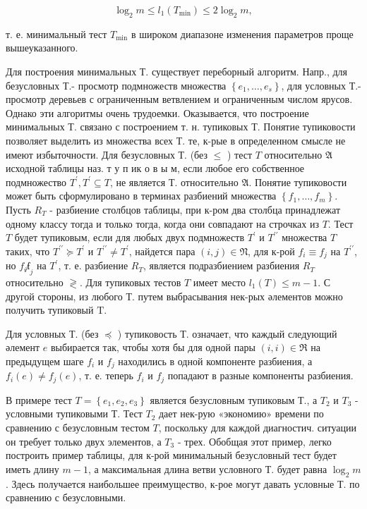 \documentclass[10pt]{article}
\begin{document}
\[

\log _{2} m \leqslant l_{1}\left(T_{\min }\right) \leqslant 2 \log _{2} m,

\]



т. е. минимальный тест $T_{\min }$ в широком диапазоне изменения параметров проще вышеуказанного.



Для построения минимальных Т. существует переборный алгоритм. Напр., для безусловных Т.- просмотр подмножеств множества $\left\{e_{1}, \ldots, e_{s}\right\}$, для условных Т.- просмотр деревьев с ограниченным ветвлением и ограниченным числом ярусов. Однако эти алгоритмы очень трудоемки. Оказывается, что построение минимальных Т. связано с построением т. н. тупиковых Т. Понятие тупиковости позволяет выделить из множества всех Т. те, к-рые в определенном смысле не имеют избыточности. Для безусловных Т. (без $\leqslant$ ) тест $T$ относительно $\mathfrak{A}$ исходной таблицы наз. т у п ик о в ы м, если любое его собственное подмножество $T^{\prime}, T^{\prime} \subseteq T$, не является Т. относительно $\mathfrak{A}$. Понятие тупиковости может быть сформулировано в терминах разбиений множества $\left\{f_{1}, \ldots, f_{m}\right\}$. Пусть $R_{T}$ - разбиение столбцов таблицы, при к-ром два столбца принадлежат одному классу тогда и только тогда, когда они совпадают на строчках из $T$. Тест $T$ будет тупиковым, если для любых двух подмножеств $T^{\prime}$ и $T^{\prime \prime}$ множества $T$ таких, что $T^{\prime \prime} \succeq T^{\prime}$ и $T^{\prime \prime} \neq T^{\prime}$, найдется пара $(i, j) \in \mathfrak{N}$, для к-рой $f_{i} \equiv f_{j}$ на $T^{\prime \prime}$, но $f_{i} \not f_{j}$ на $T^{\prime}$, т. е. разбиение $R_{T}$, является подразбиением разбиения $R_{T}$ относительно $\mathfrak{\gtrless}$. Для тупиковых тестов $T$ имеет место $l_{1}(T) \leqslant m-1$. С другой стороны, из любого Т. путем выбрасывания нек-рых әлементов можно получить тупиковый $\mathrm{T}$.



Для условных Т. (без $\preccurlyeq$ ) тупиковость Т. означает, что каждый следующий әлемент $e$ выбирается так, чтобы хотя бы для одной пары $(i, i) \in \Re$ на предыдущем шаге $f_{i}$ и $f_{j}$ находились в одной компоненте разбиения, а $f_{i}(e) \neq f_{j}(e)$, т. е. теперь $f_{i}$ и $f_{j}$ попадают в разные компоненты разбиения.



В примере тест $T=\left\{e_{1}, e_{2}, e_{3}\right\}$ является безусловным тупиковым Т., а $T_{2}$ и $T_{3}$ - условными тупиковыми Т. Тест $T_{2}$ дает нек-рую «экономию» времени по сравнению с безусловным тестом $T$, поскольку для каждой диагностич. ситуации он требует только двух элементов, а $T_{3}$ - трех. Обобщая этот пример, легко построить пример таблицы, для к-рой минимальный безусловный тест будет иметь длину $m-1$, а максимальная длина ветви условного Т. будет равна $\log _{2} m$. Здесь получается наибольшее преимущество, к-рое могут давать условные Т. по сравнению с безусловными.
\end{document}
